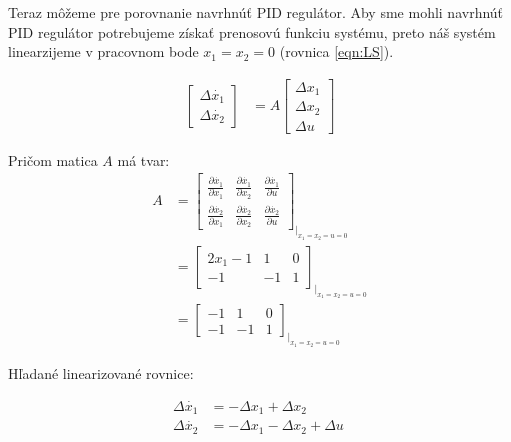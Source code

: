\documentclass[../main.tex]{subfiles}
\begin{document}
Teraz môžeme pre porovnanie navrhnúť PID regulátor. Aby sme mohli navrhnúť PID regulátor potrebujeme získať prenosovú funkciu systému, preto náš systém linearzijeme v pracovnom bode $x_1 = x_2 = 0$ (rovnica \ref{eqn:LS}).

\begin{equation}
\begin{split} 
\begin{bmatrix} \Delta \dot{x_1} \\ \Delta \dot{x_2} \end{bmatrix}  & = A\begin{bmatrix} \Delta {x_1} \\ \Delta {x_2} \\ \Delta u \end{bmatrix}
 \end{split}
 \label{eqn:LS}
\end{equation}	

Pričom matica $A$ má tvar:
\begin{equation}
\begin{split} 
 A  & = \begin{bmatrix} \frac{\partial \dot{x_1}}{\partial x_1}& \frac{\partial \dot{x_1}}{\partial x_2}& \frac{\partial \dot{x_1}}{\partial u} \\ \frac{\partial \dot{x_2}}{\partial x_1}&\frac{\partial \dot{x_2}}{\partial x_2} & \frac{\partial \dot{x_2}}{\partial u}\end{bmatrix}_{|_{x_1 = x_2 = u = 0}} \\
 & = \begin{bmatrix} 2x_1-1 & 1 & 0 \\ -1 & -1 & 1 \end{bmatrix}_{|_{x_1 = x_2 = u = 0}} \\
  & = \begin{bmatrix} -1 & 1 & 0 \\ -1 & -1 & 1 \end{bmatrix}_{|_{x_1 = x_2 = u = 0}} \
 \end{split}
 \label{eqn:AL}
\end{equation}	

Hľadané linearizované rovnice: 

\begin{equation}
\begin{split} 
\Delta \dot{x_1}  &= -\Delta x_1 + \Delta x_2 \\
\Delta \dot{x_2} & = -\Delta x_1 - \Delta x_2 + \Delta u \
 \end{split}
 \label{eqn:LR}
\end{equation}	
\end{document}

